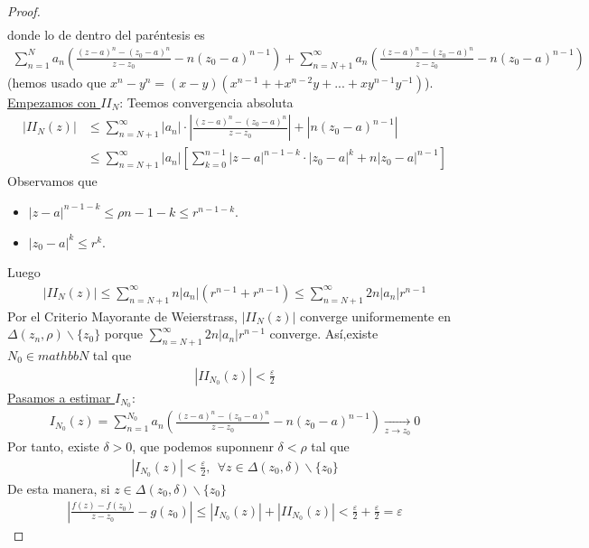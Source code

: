 \begin{proof}
\begin{align*}
\end{align*}
donde lo de dentro del paréntesis es
\begin{align*}
      \sum_{n=1}^{N}{a_n\left( \frac{(z-a)^n - (z_0-a)^n}{z-z_0} - n(z_0-a)^{n-1}\right)} + \sum_{ n= N+1}^{\infty}{a_n\left( \frac{(z-a)^n - (z_0-a)^n}{z-z_0} -n(z_0-a)^{n-1}\right)} 
\end{align*}
(hemos usado que $x^n - y^n = (x-y)(x^{n-1} + +x^{n-2}y + ... + xy^{n-1}  y^{-1})$).
\\
\newline
\underline{Empezamos con $II_N$}: Teemos convergencia absoluta
\begin{align*}
    \left| II_N(z) \right| &\leq \sum_{n = N +1}^{\infty}{|a_n| \cdot \left| \frac{(z-a)^n - (z_0-a)^n}{z-z_0} \right| + \left| n(z_0-a)^{n-1}\right|} \\\
    & \leq \sum_{n = N +1}^{\infty}{|a_n|\left[ \sum_{k=0}^{n-1}{|z-a|^{n-1-k} \cdot |z_0-a|^{k} + n|z_0-a|^{n-1}}\right]}
\end{align*}
Observamos que 
\begin{itemize}
    \item $|z-a|^{n-1-k} \leq \rho{n-1-k} \leq r^{n-1-k}$.
    \item $|z_0-a|^k \leq r^k$.
\end{itemize}
Luego
\begin{align*}
    \left| II_N(z) \right|  \leq \sum_{n=N+1}^{\infty}{n|a_n|\left( r^{n-1} + r^{n-1}\right)} \leq \sum_{n = N+1}^{\infty}{2n|a_n|r^{n-1}}
\end{align*}
Por el Criterio Mayorante de Weierstrass, $|II_N(z)|$ converge uniformemente en $\Delta(z_n,\rho)\backslash \{z_0\}$ porque $\sum_{n = N+1}^{\infty}{2n|a_n|r^{n-1}}$ converge. Así,existe $N_0 \in mathbb{N}$ tal que
\begin{align*}
    |II_{N_0}(z)| < \frac{\varepsilon}{2}
\end{align*}
\underline{Pasamos a estimar $I_{N_0}$}:
\begin{align*}
    I_{N_0}(z) = \sum_{n=1}^{N_0}{a_n\left( \frac{(z-a)^n - (z_0-a)^n}{z-z_0} - n(z_0-a)^{n-1}\right)} \xrightarrow[z \to z_0]{} 0
\end{align*}
Por tanto, existe $\delta > 0$, que podemos suponnenr $\delta < \rho$ tal que
\begin{align*}
    \left| I_{N_0}(z) \right| < \frac{\varepsilon}{2}, \ \ \forall z \in \Delta(z_0,\delta)\backslash \{z_0\}
\end{align*}
De esta manera, si $z \in \Delta(z_0,\delta)\backslash \{z_0\}$
\begin{align*}
    \left| \frac{f(z) - f(z_0)}{z-z_0} - g(z_0) \right| \leq \left| I_{N_0}(z) \right| + \left| II_{N_0}(z) \right| < \frac{\varepsilon}{2} + \frac{\varepsilon}{2} = \varepsilon
\end{align*}
\end{proof}

